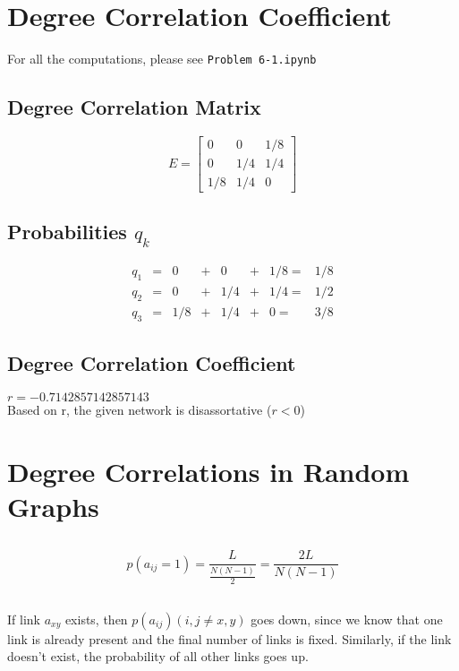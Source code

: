 \documentclass {article}
\begin{document}
\section{Degree Correlation Coefficient}
For all the computations, please see \texttt{Problem 6-1.ipynb}
\subsection{Degree Correlation Matrix}
\[
 	E = 
 	\begin{bmatrix}
 	0     &  0   & 1/8 \\
 	0     & 1/4 & 1/4 \\
  	1/8  & 1/4 & 0
 	\end{bmatrix}
\]

\subsection{Probabilities $q_k$}
\[{
\begin{array}{cccccccc}
q_1 &=& 0&+&0&+&1/8 =&1/8 \\
q_2 &=& 0&+&1/4&+&1/4 =&1/2 \\
q_3 &=& 1/8&+&1/4&+&0 =&3/8 
\end{array}
}\]
\subsection{Degree Correlation Coefficient}
$r = -0.7142857142857143$\\

Based on r, the given network is disassortative ($r < 0$)
\newpage



\section{Degree Correlations in Random Graphs}
\subsection{}
$$ p(a_{ij} = 1) = \frac{ L }{ \frac{ N(N-1) }{ 2 } } = \frac{ 2L }{ N(N-1) } $$

\subsection{}
If link $ a_{xy} $ exists, then $ p(a_{ij}) (i,j \neq x,y) $ goes down, since we know that one link is already present and the final number of links is fixed. Similarly, if the link doesn't exist, the probability of all other links goes up.
\end{document}
